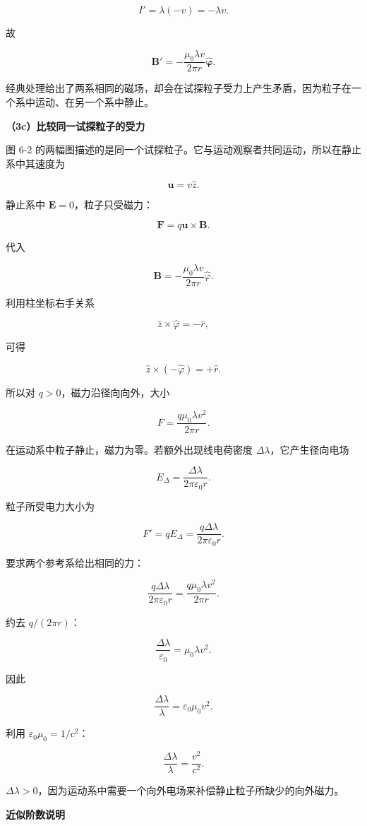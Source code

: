 \documentclass[12pt,a4paper,UTF8]{ctexart}
\begin{document}
\[I'=\lambda(-v)=-\lambda v.\]

故

\[
\boxed{
\bm B'=-\frac{\mu_0\lambda v}{2\pi r}\hat{\bm\varphi}
}.
\]

经典处理给出了两系相同的磁场，却会在试探粒子受力上产生矛盾，因为粒子在一个系中运动、在另一个系中静止。

\textbf{（3c）比较同一试探粒子的受力}

图 6-2
的两幅图描述的是同一个试探粒子。它与运动观察者共同运动，所以在静止系中其速度为

\[\bm u=v\hat z.\]

静止系中 \(\bm E=0\)，粒子只受磁力：

\[
\bm F=q\bm u\times\bm B.
\]

代入

\[\bm B=-\frac{\mu_0\lambda v}{2\pi r}\hat\varphi.\]

利用柱坐标右手关系

\[\hat z\times\hat\varphi=-\hat r,\]

可得

\[
\hat z\times(-\hat\varphi)=+\hat r.
\]

所以对 \(q>0\)，磁力沿径向向外，大小

\[
\boxed{
F=\frac{q\mu_0\lambda v^2}{2\pi r}
}.
\]

在运动系中粒子静止，磁力为零。若额外出现线电荷密度
\(\Delta\lambda\)，它产生径向电场

\[
E_{\Delta}=\frac{\Delta\lambda}{2\pi\varepsilon_0r}.
\]

粒子所受电力大小为

\[
F'=qE_{\Delta}
=\frac{q\Delta\lambda}{2\pi\varepsilon_0r}.
\]

要求两个参考系给出相同的力：

\[
\frac{q\Delta\lambda}{2\pi\varepsilon_0r}
=\frac{q\mu_0\lambda v^2}{2\pi r}.
\]

约去 \(q/(2\pi r)\)：

\[
\frac{\Delta\lambda}{\varepsilon_0}=\mu_0\lambda v^2.
\]

因此

\[
\frac{\Delta\lambda}{\lambda}
=\varepsilon_0\mu_0v^2.
\]

利用 \(\varepsilon_0\mu_0=1/c^2\)：

\[
\boxed{
\frac{\Delta\lambda}{\lambda}=\frac{v^2}{c^2}
}.
\]

\(\Delta\lambda>0\)，因为运动系中需要一个向外电场来补偿静止粒子所缺少的向外磁力。

\textbf{近似阶数说明}
\end{document}
